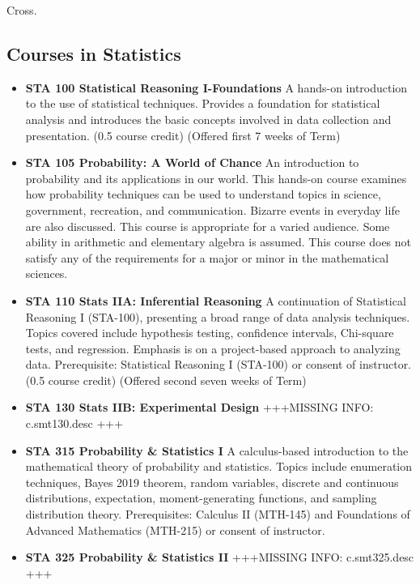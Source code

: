 \documentclass[
  letterpaper,
]{scrbook}
\providecommand{\tightlist}{%
  \setlength{\itemsep}{0pt}\setlength{\parskip}{0pt}}
\begin{document}
Cross.

\hypertarget{courses-in-statistics}{%
\subsection{Courses in Statistics}\label{courses-in-statistics}}

\begin{itemize}
\tightlist
\item
  \textbf{STA 100 Statistical Reasoning I-Foundations} A hands-on
  introduction to the use of statistical techniques. Provides a
  foundation for statistical analysis and introduces the basic concepts
  involved in data collection and presentation. (0.5 course credit)
  (Offered first 7 weeks of Term)\\
\item
  \textbf{STA 105 Probability: A World of Chance} An introduction to
  probability and its applications in our world. This hands-on course
  examines how probability techniques can be used to understand topics
  in science, government, recreation, and communication. Bizarre events
  in everyday life are also discussed. This course is appropriate for a
  varied audience. Some ability in arithmetic and elementary algebra is
  assumed. This course does not satisfy any of the requirements for a
  major or minor in the mathematical sciences.
\item
  \textbf{STA 110 Stats IIA: Inferential Reasoning} A continuation of
  Statistical Reasoning I (STA-100), presenting a broad range of data
  analysis techniques. Topics covered include hypothesis testing,
  confidence intervals, Chi-square tests, and regression. Emphasis is on
  a project-based approach to analyzing data. Prerequisite: Statistical
  Reasoning I (STA-100) or consent of instructor. (0.5 course credit)
  (Offered second seven weeks of Term)
\item
  \textbf{STA 130 Stats IIB: Experimental Design} +++MISSING INFO:
  c.smt130.desc +++
\item
  \textbf{STA 315 Probability \& Statistics I} A calculus-based
  introduction to the mathematical theory of probability and statistics.
  Topics include enumeration techniques, Bayes 2019 theorem, random
  variables, discrete and continuous distributions, expectation,
  moment-generating functions, and sampling distribution theory.
  Prerequisites: Calculus II (MTH-145) and Foundations of Advanced
  Mathematics (MTH-215) or consent of instructor.
\item
  \textbf{STA 325 Probability \& Statistics II} +++MISSING INFO:
  c.smt325.desc +++
\end{itemize}
\end{document}
